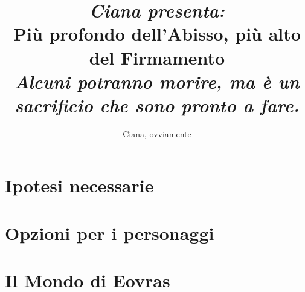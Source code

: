 \documentclass[letterpaper,twocolumn,openany,nodeprecatedcode]{dndbook}
\title{\large{\textit{Ciana presenta:}}\\
    Più profondo dell'Abisso, più alto del Firmamento \\
    \large {\textit{Alcuni potranno morire, ma è un sacrificio che sono pronto a fare.}}
    }
\author{Ciana, ovviamente}
\date{}
\begin{document}
\frontmatter

\maketitle

\tableofcontents

\mainmatter

\part{Ipotesi necessarie}







\part{Opzioni per i personaggi}



%

%

%



%











%











\part{Il Mondo di Eovras}




\end{document}
